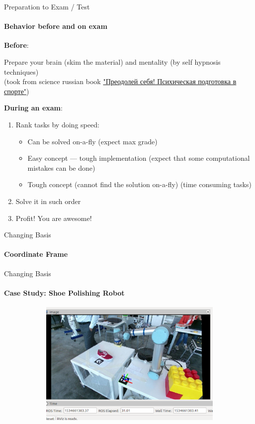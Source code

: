 \documentclass[aspectratio=169,notes]{beamer}
\begin{document}
\begin{frame}[t]{Preparation to Exam / Test}
    \vspace{-0.5cm}
\framesubtitle{Behavior before and on exam}
\textbf{Before}:

Prepare your brain (skim the material) and mentality (by self hypnosis techniques) \\ (took from science russian book \href{https://yadi.sk/d/uZhNSQW637Q3v7}{"Преодолей себя! Психическая подготовка в спорте"}) \smallskip

\textbf{During an exam}:
\begin{enumerate}
    \item Rank tasks by doing speed: \begin{itemize}
        \item Can be solved on-a-fly (expect max grade)
        \item Easy concept --- tough implementation (expect that some computational mistakes can be done)
        \item Tough concept (cannot find the solution on-a-fly) (time consuming tasks)
    \end{itemize}
    \item Solve it in such order
    \item Profit! You are awesome!
\end{enumerate}
\end{frame}

\begin{frame}[t]{Changing Basis}
\framesubtitle{Coordinate Frame}
    
\end{frame}


\begin{frame}[t]{Changing Basis}
\framesubtitle{Case Study: Shoe Polishing Robot}
\vspace{-0.6cm}
    \begin{figure}[H]
        \centering\includegraphics[height=6cm,width=1\textwidth,keepaspectratio]{change_basis_practice_2.png}
        \label{fig:change_basis_practice_2.png}
    \end{figure}
\end{frame}
\end{document}
